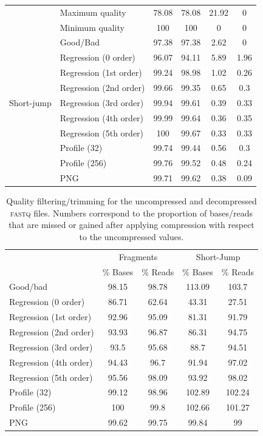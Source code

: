 \documentclass{bioinfo}
\begin{document}
\begin{table}[!tbhp]
\begin{tabular}{llcccc}
	&Maximum quality & 78.08 & 78.08 & 21.92 & 0 \\
	&Minimum quality & 100 & 100 & 0 & 0 \\ 
	&Good/Bad & 97.38 & 97.38 & 2.62 & 0 \\
	&Regression (0 order) & 96.07 & 94.11 & 5.89 & 1.96 \\
	&Regression (1st order) & 99.24 & 98.98 & 1.02 & 0.26 \\ 
	&Regression (2nd order) & 99.66 & 99.35 & 0.65 & 0.3 \\ 
	Short-jump&Regression (3rd order) & 99.94 & 99.61 & 0.39 & 0.33 \\ 
	&Regression (4th order) & 99.99 & 99.64 & 0.36 & 0.35 \\ 
	&Regression (5th order) & 100 & 99.67 & 0.33 & 0.33 \\ 
	&Profile (32) & 99.74 & 99.44 & 0.56 & 0.3 \\
	&Profile (256) & 99.76 & 99.52 & 0.48 & 0.24 \\
	&PNG & 99.71 & 99.62 & 0.38 & 0.09 \\ \hline
\end{tabular}

\label{tab:aligner}
\end{table}


\begin{table}[!tbhp]
\centering
\caption[]{Quality filtering/trimming for the uncompressed and decompressed \textsc{fastq} files. Numbers correspond to the proportion of bases/reads that are missed or gained after applying compression with respect to the uncompressed values.}
\label{tab:quality_control}
\begin{tabular}{lcccc}
	 & \multicolumn{2}{c}{Fragments} & \multicolumn{2}{c}{Short-Jump} \\
	 & \% Bases & \% Reads & \% Bases & \% Reads \\ \hline
	Good/bad & 98.15 & 98.78 & 113.09 & 103.7 \\ 
	Regression (0 order) & 86.71 & 62.64 & 43.31 & 27.51 \\
	Regression (1st order) & 92.96 & 95.09 & 81.31 & 91.79 \\ 
	Regression (2nd order) & 93.93 & 96.87 & 86.31 & 94.75 \\
	Regression (3rd order) & 93.5 & 95.68 & 88.7 & 94.51 \\ 
	Regression (4th order) & 94.43 & 96.7 & 91.94 & 97.02 \\ 
	Regression (5th order) & 95.56 & 98.09 & 93.92 & 98.02 \\ 
	Profile (32) & 99.12 & 98.96 & 102.89 & 102.24 \\
	Profile (256) & 100 & 99.8 & 102.66 & 101.27 \\
	PNG & 99.62 & 99.75 & 99.84 & 99 \\ \hline
\end{tabular}
\end{table}
\end{document}
